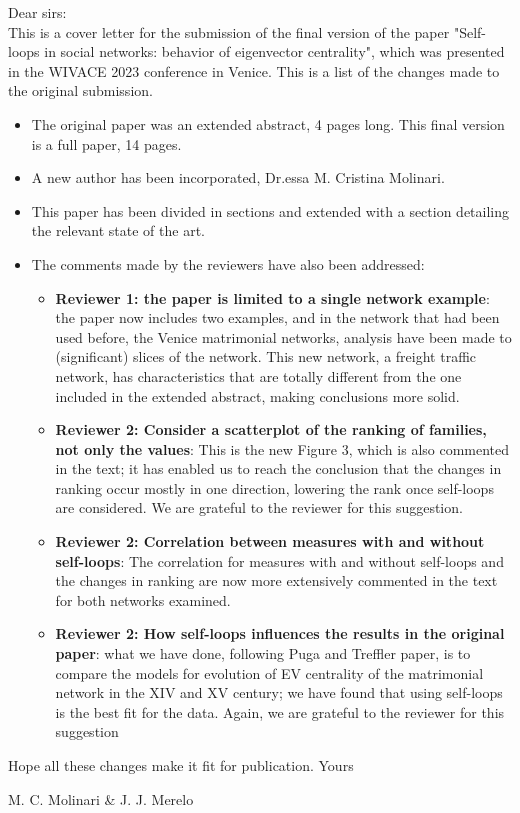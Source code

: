 \documentclass[11pt]{article}
\begin{document}
Dear sirs:\\

This is a cover letter for the submission of the final version of the paper "Self-loops in social networks: behavior of eigenvector centrality", which was presented in the WIVACE 2023 conference in Venice. This is a list of the changes made to the original submission.\begin{itemize}
\item The original paper was an extended abstract, 4 pages long. This final version is a full paper, 14 pages.
\item A new author has been incorporated, Dr.essa M. Cristina Molinari.
\item This paper has been divided in sections and extended with a section detailing the relevant state of the art.
\item The comments made by the reviewers have also been addressed:\begin{itemize}
  \item \textbf{Reviewer 1: the paper is limited to a single network example}: the paper now includes two examples, and in the network that had been used before, the Venice matrimonial networks, analysis have been made to (significant) slices of the network. This new network, a freight traffic network, has characteristics that are totally different from the one included in the extended abstract, making conclusions more solid.
  \item \textbf{Reviewer 2: Consider a scatterplot of the ranking of families, not only the values}: This is the new Figure 3, which is also commented in the text; it has enabled us to reach the conclusion that the changes in ranking occur mostly in one direction, lowering the rank once self-loops are considered. We are grateful to the reviewer for this suggestion.
  \item \textbf{Reviewer 2: Correlation between measures with and without self-loops}: The correlation for measures with and without self-loops and the changes in ranking are now more extensively commented in the text for both networks examined.
  \item \textbf{Reviewer 2: How self-loops influences the results in the original paper}:  what we have done, following Puga and Treffler paper, is to compare the models for evolution of EV centrality of the matrimonial network in the XIV and XV century; we have found that using self-loops is the best fit for the data. Again, we are grateful to the reviewer for this suggestion
  \end{itemize}
  \end{itemize}
  
Hope all these changes make it fit for publication. Yours\\


\centerline{M. C. Molinari \& J. J. Merelo}
\end{document}

